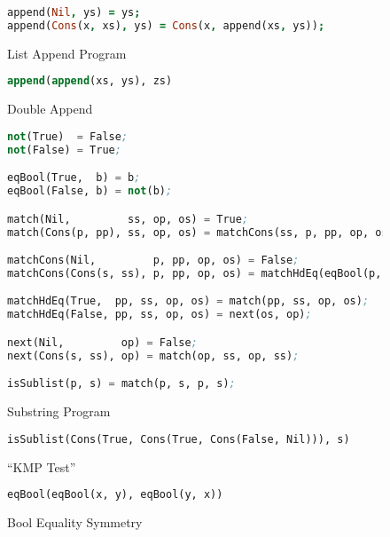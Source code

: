 \documentclass[submission,copyright,creativecommons]{eptcs}
\begin{document}
\begin{figure*}
\begin{subfigure}[b]{\linewidth}
\begin{lstlisting}[language=Prolog]
append(Nil, ys) = ys;
append(Cons(x, xs), ys) = Cons(x, append(xs, ys));
\end{lstlisting}
\caption{List Append Program}
\label{sfig:AppPrg}
\end{subfigure}

\begin{subfigure}[b]{\linewidth}
\begin{lstlisting}[language=Lisp,keywords={}]
append(append(xs, ys), zs)
\end{lstlisting}
\caption{Double Append}
\label{sfig:DoubleApp}
\end{subfigure}

\begin{subfigure}[b]{\linewidth}
\begin{lstlisting}[language=Lisp,keywords={}]
not(True)  = False;
not(False) = True;

eqBool(True,  b) = b;
eqBool(False, b) = not(b);

match(Nil,         ss, op, os) = True;
match(Cons(p, pp), ss, op, os) = matchCons(ss, p, pp, op, os);

matchCons(Nil,         p, pp, op, os) = False;
matchCons(Cons(s, ss), p, pp, op, os) = matchHdEq(eqBool(p, s), pp, ss, op, os);

matchHdEq(True,  pp, ss, op, os) = match(pp, ss, op, os);
matchHdEq(False, pp, ss, op, os) = next(os, op);

next(Nil,         op) = False;
next(Cons(s, ss), op) = match(op, ss, op, ss);

isSublist(p, s) = match(p, s, p, s);
\end{lstlisting}
\caption{Substring Program}
\label{sfig:SubstrPrg}
\end{subfigure}

\begin{subfigure}[b]{\linewidth}
\begin{lstlisting}[language=Lisp,keywords={}]
isSublist(Cons(True, Cons(True, Cons(False, Nil))), s)
\end{lstlisting}
\caption{``KMP Test''}
\label{sfig:KMP}
\end{subfigure}

\begin{subfigure}[b]{\linewidth}
\begin{lstlisting}[language=Lisp,keywords={}]
eqBool(eqBool(x, y), eqBool(y, x))
\end{lstlisting}
\caption{Bool Equality Symmetry}
\label{sfig:BoolEqSym}
\end{subfigure}


\end{figure*}
\end{document}
